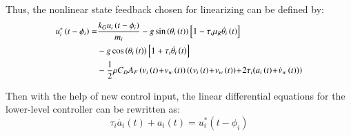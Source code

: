 \documentclass[journal]{IEEEtran}
\begin{document}
Thus, the nonlinear state feedback chosen for linearizing can be defined by:
\begin{equation}
  \begin{small}
    \begin{aligned}
      u_i^\ast\left(t-\phi_i\right)  = & \frac{k_Gu_i\left(t-\phi_i\right)}{m_i}-g\sin{\left(\theta_i\left(t\right)\right)}\left[1-\tau_i\mu_R\dot{\theta_i}\left(t\right)\right]                                                                           \\ & -g\cos{\left(\theta_i\left(t\right)\right)}\left[1+\tau_i\dot{\theta_i}\left(t\right)\right] \\
                                & -\frac{1}{2}\rho C_DA_F\left(v_i\left(t\right)\!+\!v_w\left(t\right)\right)\left(\left(v_i\left(t\right)\!+\!v_w\left(t\right)\right)\!+\!2\tau_i(a_i\left(t\right)\!+\!\dot{v}_{w}\left(t\right))\right)
    \end{aligned}
  \end{small}
  \label{Eq18}
\end{equation}


Then with the help of new control input, the linear differential equations for the lower-level controller can be rewritten as:
\begin{equation}
  \tau_i\dot{a_i}\left(t\right)+a_i\left(t\right)=u_i^\ast(t-\phi_i)
  \label{Eq19}
\end{equation}
\end{document}
